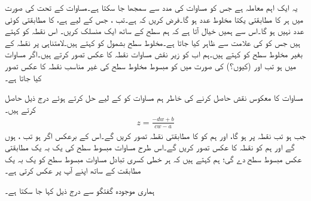  یہ ایک اہم معاملہ ہے جس کو مساوات  کی مدد سے  سمجھا جا سکتا ہے۔مساوات  کے تحت  کی صورت میں ہر  کا مطابقتی یکتا مخلوط عدد  ہو گا۔فرض کریں کہ  ہے۔تب ، جس کے لیے  ہے، کا مطابقتی کوئی عدد  نہیں ہو گا۔اس سے ہمیں خیال آتا ہے کہ ہم  سطح کے ساتھ ایک  منسلک کریں۔ اس نقطہ کو  کہتے ہیں جس کو  کی علامت سے ظاہر کیا جاتا ہے۔مخلوط سطح بشمول  کو  کہتے ہیں۔لامتناہی پر نقطہ کے بغیر مخلوط سطح کو  کہتے ہیں۔ہم اب  کو زیر نقش مساوات  نقطہ  کا عکس تصور کرتے ہیں۔اگر مساوات  میں  ہو تب  اور  (کیوں؟) کی صورت میں   کو مبسوط مخلوط  سطح کی غیر مناسب نقطہ   کا عکس تصور کیا جاتا ہے۔

مساوات  کا معکوس نقش حاصل کرنے کی خاطر ہم مساوات  کو  کے لیے حل کرتے  ہوئے درج ذیل حاصل کرتے ہیں۔
\begin{align}
z=\frac{-dw+b}{cw-a}
\end{align}
جب  ہو تب  نقطہ  پر ہو گا، اور ہم   کو  کا مطابقتی نقطہ تصور کریں گے۔اس کے برعکس اگر  ہو تب  ،  ہوں گے اور ہم  کو نقطہ  کا عکس تصور کریں گے۔اس طرح مساوات  مبسوط  سطح کی یک بہ یک مطابقتی عکس مبسوط  سطح دے گی؛ ہم کہتے ہیں کہ ہر خطی کسری تبادل مساوات  مبسوط سطح کو یک بہ یک مطابقت کے ساتھ اپنے آپ پر عکس کرتی ہے۔

ہماری موجودہ گفتگو سے درج ذیل کہا جا سکتا ہے۔

